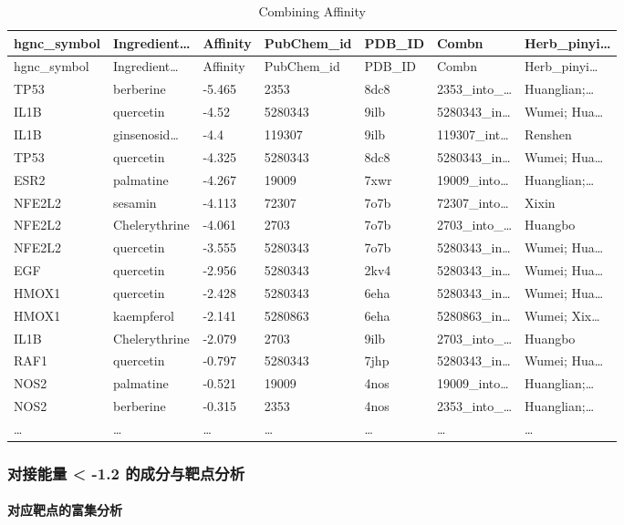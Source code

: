 \documentclass[
]{article}
\begin{document}
\begin{longtable}[]{@{}lllllll@{}}
\caption{\label{tab:Combining-Affinity}Combining Affinity}\tabularnewline
\toprule
hgnc\_symbol & Ingredient\ldots{} & Affinity & PubChem\_id & PDB\_ID & Combn & Herb\_pinyi\ldots{}\tabularnewline
\midrule
\endfirsthead
\toprule
hgnc\_symbol & Ingredient\ldots{} & Affinity & PubChem\_id & PDB\_ID & Combn & Herb\_pinyi\ldots{}\tabularnewline
\midrule
\endhead
TP53 & berberine & -5.465 & 2353 & 8dc8 & 2353\_into\_\ldots{} & Huanglian;\ldots{}\tabularnewline
IL1B & quercetin & -4.52 & 5280343 & 9ilb & 5280343\_in\ldots{} & Wumei; Hua\ldots{}\tabularnewline
IL1B & ginsenosid\ldots{} & -4.4 & 119307 & 9ilb & 119307\_int\ldots{} & Renshen\tabularnewline
TP53 & quercetin & -4.325 & 5280343 & 8dc8 & 5280343\_in\ldots{} & Wumei; Hua\ldots{}\tabularnewline
ESR2 & palmatine & -4.267 & 19009 & 7xwr & 19009\_into\ldots{} & Huanglian;\ldots{}\tabularnewline
NFE2L2 & sesamin & -4.113 & 72307 & 7o7b & 72307\_into\ldots{} & Xixin\tabularnewline
NFE2L2 & Chelerythrine & -4.061 & 2703 & 7o7b & 2703\_into\_\ldots{} & Huangbo\tabularnewline
NFE2L2 & quercetin & -3.555 & 5280343 & 7o7b & 5280343\_in\ldots{} & Wumei; Hua\ldots{}\tabularnewline
EGF & quercetin & -2.956 & 5280343 & 2kv4 & 5280343\_in\ldots{} & Wumei; Hua\ldots{}\tabularnewline
HMOX1 & quercetin & -2.428 & 5280343 & 6eha & 5280343\_in\ldots{} & Wumei; Hua\ldots{}\tabularnewline
HMOX1 & kaempferol & -2.141 & 5280863 & 6eha & 5280863\_in\ldots{} & Wumei; Xix\ldots{}\tabularnewline
IL1B & Chelerythrine & -2.079 & 2703 & 9ilb & 2703\_into\_\ldots{} & Huangbo\tabularnewline
RAF1 & quercetin & -0.797 & 5280343 & 7jhp & 5280343\_in\ldots{} & Wumei; Hua\ldots{}\tabularnewline
NOS2 & palmatine & -0.521 & 19009 & 4nos & 19009\_into\ldots{} & Huanglian;\ldots{}\tabularnewline
NOS2 & berberine & -0.315 & 2353 & 4nos & 2353\_into\_\ldots{} & Huanglian;\ldots{}\tabularnewline
\ldots{} & \ldots{} & \ldots{} & \ldots{} & \ldots{} & \ldots{} & \ldots{}\tabularnewline
\bottomrule
\end{longtable}

\hypertarget{ux5bf9ux63a5ux80fdux91cf--1.2-ux7684ux6210ux5206ux4e0eux9776ux70b9ux5206ux6790}{%
\subsubsection{对接能量 \textless{} -1.2 的成分与靶点分析}\label{ux5bf9ux63a5ux80fdux91cf--1.2-ux7684ux6210ux5206ux4e0eux9776ux70b9ux5206ux6790}}

\hypertarget{ux5bf9ux5e94ux9776ux70b9ux7684ux5bccux96c6ux5206ux6790}{%
\paragraph{对应靶点的富集分析}\label{ux5bf9ux5e94ux9776ux70b9ux7684ux5bccux96c6ux5206ux6790}}
\end{document}
